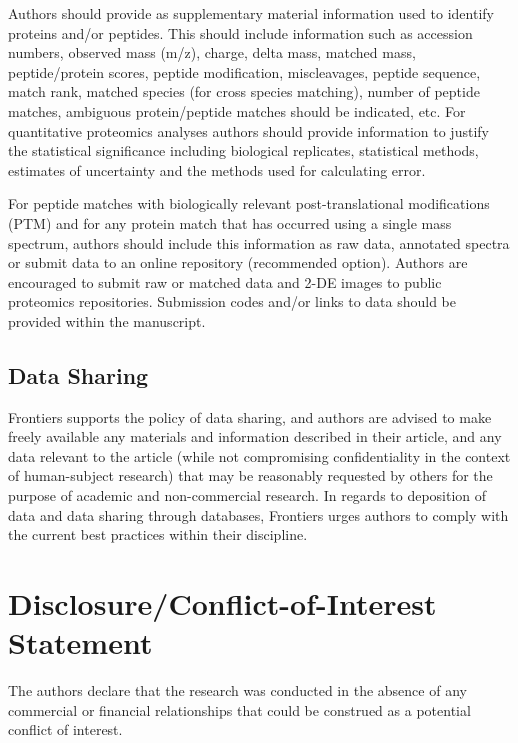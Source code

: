 \documentclass{frontiersMED} %
\begin{document}
Authors should provide as supplementary material information used to identify proteins and/or peptides. This should include information such as accession numbers, observed mass (m/z), charge, delta mass, matched mass, peptide/protein scores, peptide modification, miscleavages, peptide sequence, match rank, matched species (for cross species matching), number of peptide matches, ambiguous protein/peptide matches should be indicated, etc.
For quantitative proteomics analyses authors should provide information to justify the statistical significance including biological replicates, statistical methods, estimates of uncertainty and the methods used for calculating error.

For peptide matches with biologically relevant post-translational modifications (PTM) and for any protein match that has occurred using a single mass spectrum, authors should include this information as raw data, annotated spectra or submit data to an online repository (recommended option).
Authors are encouraged to submit raw or matched data and 2-DE images to public proteomics repositories. Submission codes and/or links to data should be provided within the manuscript.

\subsection{Data Sharing}

Frontiers supports the policy of data sharing, and authors are advised to make freely available any materials and information described in their article, and any data relevant to the article (while not compromising confidentiality in the context of human-subject research) that may be reasonably requested by others for the purpose of academic and non-commercial research. In regards to deposition of data and data sharing through databases, Frontiers urges authors to comply with the current best practices within their discipline.

\section*{Disclosure/Conflict-of-Interest Statement}
The authors declare that the research was conducted in the absence of any commercial or financial relationships that could be construed as a potential conflict of interest.
\end{document}
